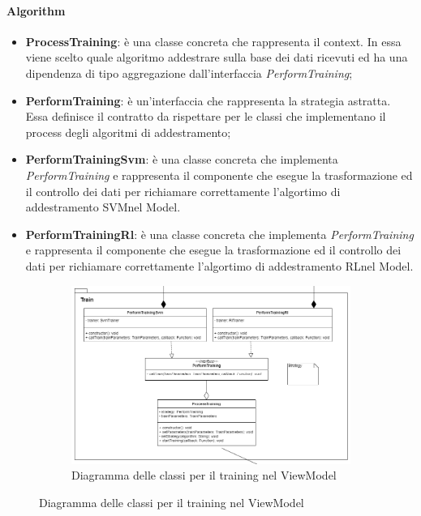 		\paragraph*{Algorithm} \mbox{}
		\begin{itemize}
			\item \textbf{ProcessTraining}: è una classe concreta che rappresenta il context. In essa viene scelto quale algoritmo addestrare sulla base dei dati ricevuti ed ha una dipendenza di tipo aggregazione dall'interfaccia \textit{PerformTraining};
			\item \textbf{PerformTraining}: è un'interfaccia che rappresenta la strategia astratta. Essa definisce il contratto da rispettare per le classi che implementano il process degli algoritmi di addestramento;
			\item \textbf{PerformTrainingSvm}: è una classe concreta che implementa \textit{PerformTraining} e rappresenta il componente che esegue la trasformazione ed il controllo dei dati per richiamare correttamente l'algortimo di addestramento SVM\glosp nel Model.
			\item \textbf{PerformTrainingRl}: è una classe concreta che implementa \textit{PerformTraining} e rappresenta il componente che esegue la trasformazione ed il controllo dei dati per richiamare correttamente l'algortimo di addestramento RL\glosp nel Model.
		\end{itemize}
		\mbox{}
		\begin{landscape}
			\begin{figure}
				\begin{figure} [H]
					\includegraphics[width=\linewidth]{img/Diagrammi/ViewModel-train-app.png}
					\caption{Diagramma delle classi per il training nel ViewModel}
				\end{figure}
			\end{figure}
		\end{landscape}
